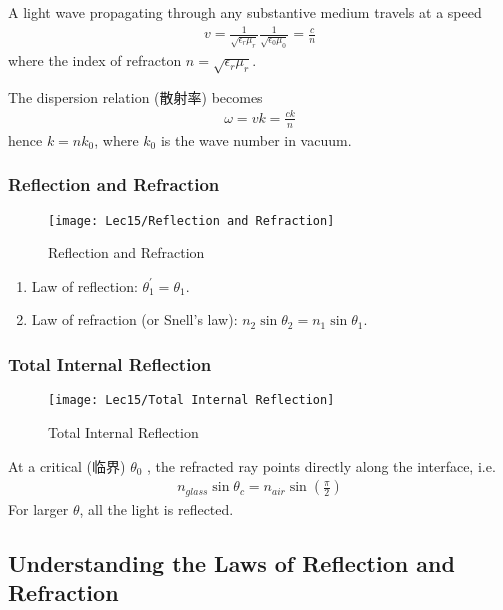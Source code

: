 A light wave propagating through any substantive medium travels at a speed
\begin{align*}
    v=\frac{1}{\sqrt{\epsilon_r \mu_r}}\frac{1}{\sqrt{\epsilon_0 \mu_0}}=\frac{c }{n }
\end{align*}
where the index of refracton $n=\sqrt{\epsilon_r \mu_r}$. 

The dispersion relation (散射率) becomes
\begin{align*}
    \omega=vk=\frac{ck }{n}    
\end{align*}
hence $k=nk_0$, where $k_0$ is the wave number in vacuum.

\subsubsection{Reflection and Refraction}
\begin{figure}[H]
    \centering
    \texttt{[image: Lec15/Reflection and Refraction]}
    \caption{Reflection and Refraction}
\end{figure}

\begin{enumerate}
    \item Law of reflection: $\theta_1^{\prime}=\theta_1$. 
    \item Law of refraction (or Snell's law): $n_2\sin\theta_2=n_1\sin\theta_1$. 
\end{enumerate}

\subsubsection{Total Internal Reflection}
\begin{figure}[H]
    \centering
    \texttt{[image: Lec15/Total Internal Reflection]}
    \caption{Total Internal Reflection}
\end{figure}

At a critical (临界) $\theta_0$ , the refracted ray points directly along the interface, i.e.
\begin{align*}
    n_{glass}\sin\theta_c=n_{air}\sin\left( \frac{\pi}{2} \right)
\end{align*}
For larger $\theta$, all the light is reflected. 

\subsection{Understanding the Laws of Reflection and Refraction}


